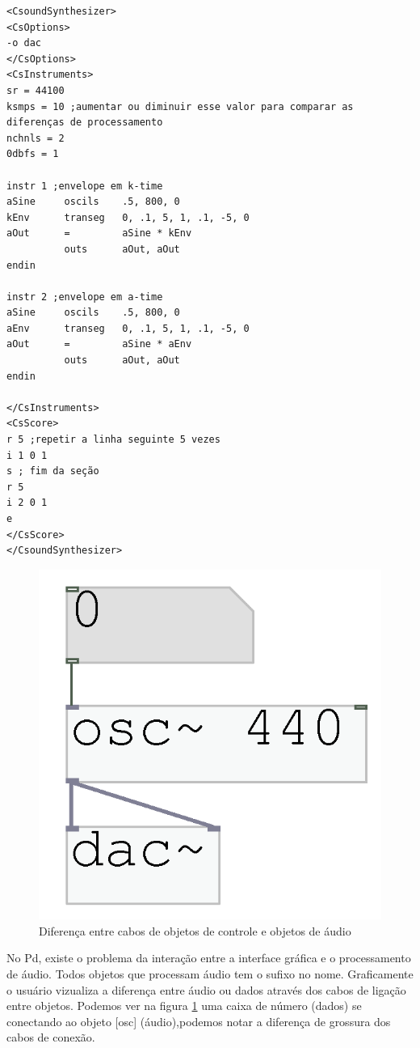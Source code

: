 \documentclass{ppgmus}
\begin{document}
\begin{verbatim}
<CsoundSynthesizer>
<CsOptions>
-o dac
</CsOptions>
<CsInstruments>
sr = 44100
ksmps = 10 ;aumentar ou diminuir esse valor para comparar as diferenças de processamento
nchnls = 2
0dbfs = 1

instr 1 ;envelope em k-time
aSine     oscils    .5, 800, 0
kEnv      transeg   0, .1, 5, 1, .1, -5, 0
aOut      =         aSine * kEnv
          outs      aOut, aOut
endin

instr 2 ;envelope em a-time
aSine     oscils    .5, 800, 0
aEnv      transeg   0, .1, 5, 1, .1, -5, 0
aOut      =         aSine * aEnv
          outs      aOut, aOut
endin

</CsInstruments>
<CsScore>
r 5 ;repetir a linha seguinte 5 vezes
i 1 0 1
s ; fim da seção
r 5 
i 2 0 1
e
</CsScore>
</CsoundSynthesizer>
\end{verbatim} 

\begin{figure}
\includegraphics[scale=.6]{cabos}
\caption{Diferença entre cabos de objetos de controle e objetos de áudio}
\label{cabos}
\end{figure}

No Pd, existe o problema da interação entre a interface gráfica e 
o processamento de áudio. Todos objetos que processam áudio tem o sufixo \texttildelow no
nome. Graficamente o usuário vizualiza a diferença
entre áudio ou dados através dos cabos de ligação entre objetos. Podemos
ver na figura \ref{cabos} uma caixa de número (dados) se conectando ao objeto [osc\texttildelow]
(áudio),podemos notar a diferença de grossura dos cabos de conexão.
\end{document}
